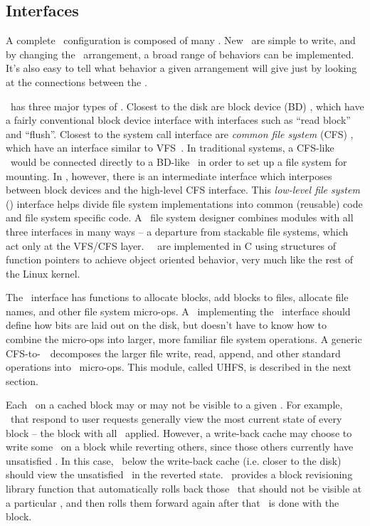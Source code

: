 \subsection {Interfaces}
\label{sec:modules:interfaces}

A complete \Kudos\ configuration is composed of many \modules. New \modules\ are
simple to write, and by changing the \module\ arrangement, a broad range of
behaviors can be implemented. It's also easy to tell what behavior a given
arrangement will give just by looking at the connections between the \modules.

\Kudos\ has three major types of \modules.
%
Closest to the disk are block device (BD) \modules, which have a fairly
conventional block device interface with interfaces such as ``read block'' and
``flush''. 
%
Closest to the system call interface are \emph{common file system} (CFS)
\modules, which have an interface similar to VFS~\cite{kleiman86vnodes}. 
%
In traditional systems, a CFS-like \module\ would be connected directly to a
BD-like \module\ in order to set up a file system for mounting. In \Kudos,
however, there is an intermediate interface which interposes between block
devices and the high-level CFS interface.
%
This \emph{low-level file system} (\LFS) interface helps divide file system
implementations into common (reusable) code and file system specific code. A
\Kudos\ file system designer combines modules with all three interfaces in many
ways -- a departure from stackable file systems, which act only at the VFS/CFS
layer. \Kudos\ \modules\ are implemented in C using structures of function
pointers to achieve object oriented behavior, very much like the rest of the
Linux kernel.

The \LFS\ interface has functions to allocate blocks, add blocks to files,
allocate file names, and other file system micro-ops. A \module\ implementing
the \LFS\ interface should define how bits are laid out on the disk, but doesn't
have to know how to combine the micro-ops into larger, more familiar file system
operations. A generic CFS-to-\LFS\ \module\ decomposes the larger file write,
read, append, and other standard operations into \LFS\ micro-ops. This module,
called UHFS, is described in the next section.

Each \chdesc\ on a cached block may or may not be visible to a given \module.
For example, \modules\ that respond to user requests generally view the most
current state of every block -- the block with all \chdescs\ applied. However, a
write-back cache may choose to write some \chdescs\ on a block while reverting
others, since those others currently have unsatisfied \befores. In this case,
\modules\ below the write-back cache (i.e. closer to the disk) should view the
unsatisfied \chdescs\ in the reverted state. \Kudos\ provides a block
revisioning library function that automatically rolls back those \chdescs\ that
should not be visible at a particular \module, and then rolls them forward again
after that \module\ is done with the block.
